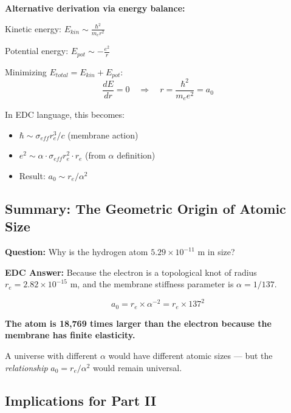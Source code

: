 \textbf{Alternative derivation via energy balance:}

Kinetic energy: $E_{kin} \sim \frac{\hbar^2}{m_e r^2}$

Potential energy: $E_{pot} \sim -\frac{e^2}{r}$

Minimizing $E_{total} = E_{kin} + E_{pot}$:
\begin{equation}
\frac{dE}{dr} = 0 \quad \Rightarrow \quad r = \frac{\hbar^2}{m_e e^2} = a_0
\end{equation}

In EDC language, this becomes:
\begin{itemize}
    \item $\hbar \sim \sigma_{eff} r_e^3 / c$ (membrane action)
    \item $e^2 \sim \alpha \cdot \sigma_{eff} r_e^2 \cdot r_e$ (from $\alpha$ definition)
    \item Result: $a_0 \sim r_e/\alpha^2$
\end{itemize}

\subsection{Summary: The Geometric Origin of Atomic Size}
\label{subsec:summary}

\begin{tcolorbox}[colback=gray!10,colframe=black,title=\textbf{Key Result}]
\textbf{Question:} Why is the hydrogen atom $5.29 \times 10^{-11}$ m in size?

\textbf{EDC Answer:} Because the electron is a topological knot of radius $r_e = 2.82 \times 10^{-15}$ m, and the membrane stiffness parameter is $\alpha = 1/137$.

\begin{equation}
a_0 = r_e \times \alpha^{-2} = r_e \times 137^2
\end{equation}

\textbf{The atom is 18,769 times larger than the electron because the membrane has finite elasticity.}

A universe with different $\alpha$ would have different atomic sizes --- but the \textit{relationship} $a_0 = r_e/\alpha^2$ would remain universal.
\end{tcolorbox}

\subsection{Implications for Part II}
\label{subsec:implications}

